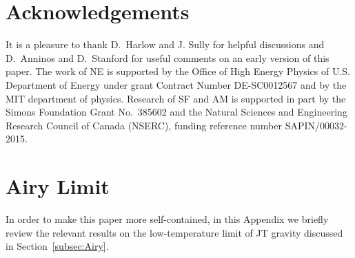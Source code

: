\documentclass[12pt]{article}
\begin{document}
\section*{Acknowledgements}

It is a pleasure to thank D.~Harlow and J. Sully for helpful discussions and D.~Anninos and D.~Stanford for useful comments on an early version of this paper. The work of NE is supported by the Office of High Energy Physics of U.S. Department of Energy under grant Contract Number DE-SC0012567 and by the MIT department of physics. 
Research of SF and AM is supported in part by the Simons Foundation Grant No.~385602 and the Natural Sciences and Engineering Research Council of Canada (NSERC), funding reference number SAPIN/00032-2015.

\appendix


\section{Airy Limit}
\label{app:Airy}

In order to make this paper more self-contained, in this Appendix we briefly review the relevant results on the low-temperature limit of JT gravity discussed in Section~\ref{subsec:Airy}.
\end{document}
